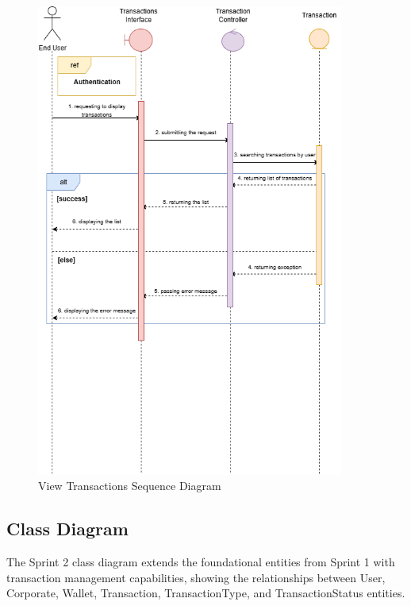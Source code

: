 \begin{figure}[H]
\centering
\includegraphics[width=0.9\textwidth]{images/seq_view_transactions.png}
\caption{View Transactions Sequence Diagram}
\label{fig:seq_view_transactions}
\end{figure}

\subsection{Class Diagram}

The Sprint 2 class diagram extends the foundational entities from Sprint 1 with transaction management capabilities, showing the relationships between User, Corporate, Wallet, Transaction, TransactionType, and TransactionStatus entities.

